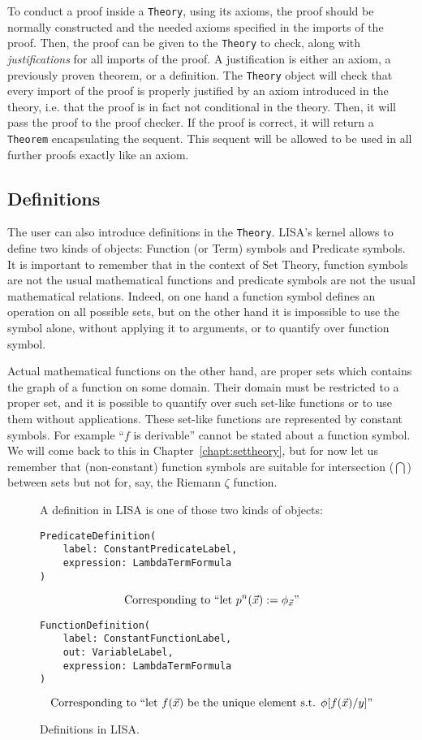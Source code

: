 To conduct a proof inside a \lstinline{Theory}{}, using its axioms, the proof should be normally constructed and the needed axioms specified in the imports of the proof. Then, the proof can be given to the \lstinline{Theory}{} to check, along with \textit{justifications} for all imports of the proof. A justification is either an axiom, a previously proven theorem, or a definition. The \lstinline{Theory}{} object will check that every import of the proof is properly justified by an axiom introduced in the theory, i.e. that the proof is in fact not conditional in the theory. Then, it will pass the proof to the proof checker. If the proof is correct, it will return a \lstinline{Theorem}{} encapsulating the sequent. This sequent will be allowed to be used in all further proofs exactly like an axiom.


\subsection{Definitions}
\label{subsec:definitions}
The user can also introduce definitions in the \lstinline{Theory}{}.
LISA's kernel allows to define two kinds of objects: Function (or Term) symbols and Predicate symbols. It is important to remember that in the context of Set Theory, function symbols are not the usual mathematical functions and predicate symbols are not the usual mathematical relations. Indeed, on one hand a function symbol defines an operation on all possible sets, but on the other hand it is impossible to use the symbol alone, without applying it to arguments, or to quantify over function symbol.

Actual mathematical functions on the other hand, are proper sets which contains the graph of a function on some domain. Their domain must be restricted to a proper set, and it is possible to quantify over such set-like functions or to use them without applications. These set-like functions are represented by constant symbols.  For example ``$f$ is derivable'' cannot be stated about a function symbol. We will come back to this in Chapter~\ref{chapt:settheory}, but for now let us remember that (non-constant) function symbols are suitable for intersection ($\bigcap$) between sets but not for, say, the Riemann $\zeta$ function.


\begin{figure}
  A definition in LISA is one of those two kinds of objects:
  \begin{lstlisting}[frame=single]
PredicateDefinition(
    label: ConstantPredicateLabel,
    expression: LambdaTermFormula
)
\end{lstlisting}
  $$
    \textnormal{Corresponding to ``let } p^n(\vec{x}) := \phi_{\vec{x}}\textnormal{''}
  $$
  \begin{lstlisting}[frame=single]
FunctionDefinition(
    label: ConstantFunctionLabel,
    out: VariableLabel, 
    expression: LambdaTermFormula
)
\end{lstlisting}
  $$
    \textnormal{Corresponding to ``let } f(\vec{x}) \textnormal{ be the unique element s.t. } \phi[f(\vec{x})/y]\textnormal{''}
  $$
  \caption{Definitions in LISA.}
  \label{fig:definitions}
\end{figure}

